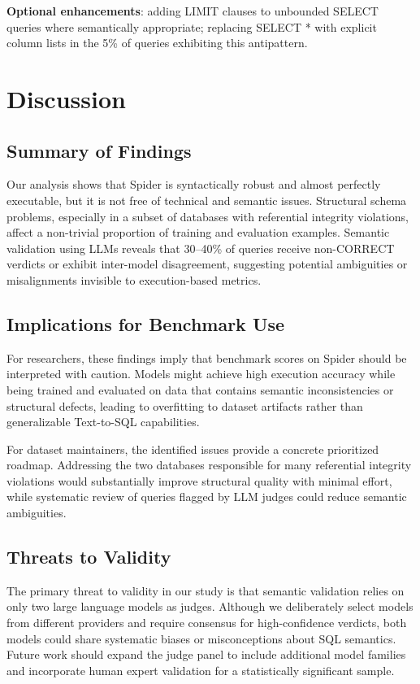 \documentclass[]{einformatica}
\begin{document}
\textbf{Optional enhancements}: adding LIMIT clauses to unbounded SELECT queries where semantically appropriate; replacing SELECT * with explicit column lists in the 5\% of queries exhibiting this antipattern.

\section{Discussion}\label{sec:Discussion}

\subsection{Summary of Findings}

Our analysis shows that Spider is syntactically robust and almost perfectly executable, but it is not free of technical and semantic issues. Structural schema problems, especially in a subset of databases with referential integrity violations, affect a non-trivial proportion of training and evaluation examples. Semantic validation using LLMs reveals that 30--40\% of queries receive non-CORRECT verdicts or exhibit inter-model disagreement, suggesting potential ambiguities or misalignments invisible to execution-based metrics.

\subsection{Implications for Benchmark Use}

For researchers, these findings imply that benchmark scores on Spider should be interpreted with caution. Models might achieve high execution accuracy while being trained and evaluated on data that contains semantic inconsistencies or structural defects, leading to overfitting to dataset artifacts rather than generalizable Text-to-SQL capabilities.

For dataset maintainers, the identified issues provide a concrete prioritized roadmap. Addressing the two databases responsible for many referential integrity violations would substantially improve structural quality with minimal effort, while systematic review of queries flagged by LLM judges could reduce semantic ambiguities.

\subsection{Threats to Validity}

The primary threat to validity in our study is that semantic validation relies on only two large language models as judges. Although we deliberately select models from different providers and require consensus for high-confidence verdicts, both models could share systematic biases or misconceptions about SQL semantics. Future work should expand the judge panel to include additional model families and incorporate human expert validation for a statistically significant sample.
\end{document}
